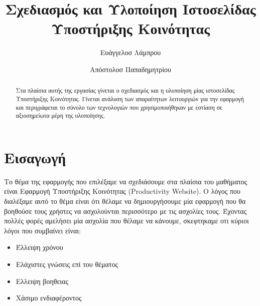 \documentclass[nonacm, language=english, language=greek]{acmart}
\newcommand{\en}[1]{\textlatin{#1}}
\begin{document}
\title{Σχεδιασμός και Υλοποίηση Ιστοσελίδας Υποστήριξης Κοινότητας}

\author{Ευάγγελοσ Λάμπρου}
\orcid{}

\author{Απόστολοσ Παπαδημητρίου}

\begin{abstract}
    Στα πλαίσια αυτής της εργασίας γίνεται ο σχεδιασμός και η υλοποίηση μίας 
    ιστοσελίδας Υποστήριξης Κοινότητας. Γίνεται ανάλυση των απαραίτητων 
    λειτουργιών για την εφαρμογή και περιγράφεται το σύνολο των τεχνολογιών 
    που χρησιμοποιήθηκαν με εστίαση σε αξιοσημείωτα μέρη της υλοποίησης.
\end{abstract}

\maketitle

\section{Εισαγωγή}

Το θέμα της εφαρμογής που επιλέξαμε να σχεδιάσουμε στα πλαίσια του μαθήματος είναι Εφαρμογή Υποστήριξης Κοινότητας (\en{Productivity Website}). Ο λόγος που διαλέξαμε αυτό το θέμα είναι ότι θέλαμε να δημιουργήσουμε μία εφαρμογή που θα βοηθούσε τους χρήστες να ασχολούνται περισσότερο με τις ασχολίες τους.
Έχοντας πολλές φορές αμελήσει μία ασχολία που θέλαμε να κάνουμε, σκεφτηκαμε οτι κύριοι λόγοι που συμβαίνει είναι:
\begin{itemize}
    \item Έλλειψη χρόνου
    \item Ελάχιστες γνώσεις επί του θέματος
    \item Ελλειψη βοηθειας
    \item Χάσιμο ενδιαφέροντος
\end{itemize}
\end{document}
